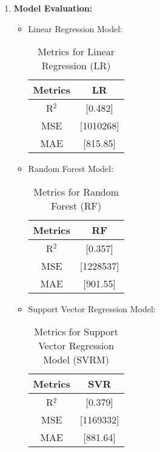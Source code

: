\documentclass[12pt]{article}
\begin{document}
\begin{enumerate}
    \item \textbf{Model Evaluation:}
    \begin{itemize}
        \item Linear Regression Model:\\
        \begin{table}[h]
            \centering
            \begin{tabular}{|c|c|}
            \hline
            \textbf{Metrics} & \textbf{LR} \\
            \hline
            R$^2$ & [0.482] \\
            \hline
            MSE & [1010268] \\
            \hline
            MAE & [815.85] \\
            \hline
            \end{tabular}
            \caption{Metrics for Linear Regression (LR)}
            \label{tab:metrics_lr}
            \end{table}
        \item Random Forest Model:\\
        \begin{table}[h]
            \centering
            \begin{tabular}{|c|c|}
            \hline
            \textbf{Metrics} & \textbf{RF} \\
            \hline
            R$^2$ & [0.357] \\
            \hline
            MSE & [1228537] \\
            \hline
            MAE & [901.55] \\
            \hline
            \end{tabular}
            \caption{Metrics for Random Forest (RF)}
            \label{tab:metrics_lr}
            \end{table}
        \item Support Vector Regression Model:\\
        \begin{table}[h]
            \centering
            \begin{tabular}{|c|c|}
            \hline
            \textbf{Metrics} & \textbf{SVR} \\
            \hline
            R$^2$ & [0.379] \\
            \hline
            MSE & [1169332] \\
            \hline
            MAE & [881.64] \\
            \hline
            \end{tabular}
            \caption{Metrics for Support Vector Regression Model (SVRM)}
            \label{tab:metrics_lr}
            \end{table}
    \end{itemize}


\end{enumerate}
\end{document}
